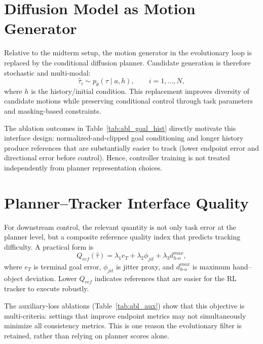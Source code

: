 \section{Diffusion Model as Motion Generator}
\label{sec:diffusion_in_evo}

Relative to the midterm setup, the motion generator in the evolutionary loop is replaced by the conditional diffusion planner. Candidate generation is therefore stochastic and multi-modal:
\begin{equation}
\hat\tau_i \sim p_\theta(\tau \mid a, h), \qquad i=1,\dots,N,
\label{eq:candidate_sampling_diffusion}
\end{equation}
where $h$ is the history/initial condition. This replacement improves diversity of candidate motions while preserving conditional control through task parameters and masking-based constraints.

The ablation outcomes in Table~\ref{tab:abl_goal_hist} directly motivate this interface design: normalized-and-clipped goal conditioning and longer history produce references that are substantially easier to track (lower endpoint error and directional error before control). Hence, controller training is not treated independently from planner representation choices.

\section{Planner--Tracker Interface Quality}
\label{sec:planner_tracker_interface}

For downstream control, the relevant quantity is not only task error at the planner level, but a composite reference quality index that predicts tracking difficulty. A practical form is
\begin{equation}
Q_{ref}(\hat\tau)=\lambda_1 e_T + \lambda_2 \phi_{jit} + \lambda_3 d_{h\text{-}o}^{max},
\label{eq:ref_quality_idx}
\end{equation}
where $e_T$ is terminal goal error, $\phi_{jit}$ is jitter proxy, and $d_{h\text{-}o}^{max}$ is maximum hand--object deviation. Lower $Q_{ref}$ indicates references that are easier for the RL tracker to execute robustly.

The auxiliary-loss ablations (Table~\ref{tab:abl_aux}) show that this objective is multi-criteria: settings that improve endpoint metrics may not simultaneously minimize all consistency metrics. This is one reason the evolutionary filter is retained, rather than relying on planner scores alone.

